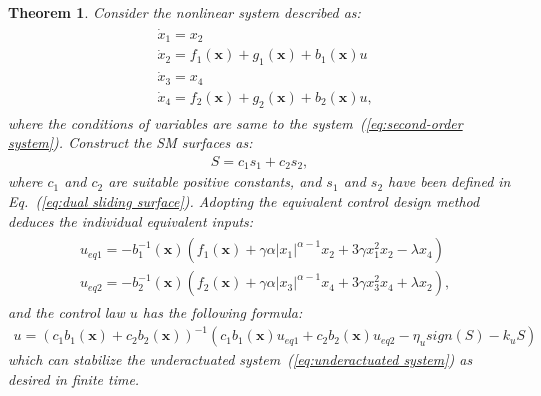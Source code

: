 \documentclass[3p]{elsarticle}
\theoremstyle{plain}
\newtheorem{mythm}{Theorem}
\theoremstyle{remark}
\begin{document}
\begin{mythm}
Consider the nonlinear system described as:
\begin{align}
\begin{split}
&\dot x_1 = x_2\\
&\dot x_2 = f_1(\bm x) + g_1(\bm x)+b_1(\bm x)u\\
&\dot x_3 = x_4\\
&\dot x_4 = f_2(\bm x) + g_2(\bm x)+b_2(\bm x)u,\label{eq:underactuated system}
\end{split}
\end{align}
where the conditions of variables are same to the system~(\ref{eq:second-order system}). Construct the SM surfaces as:
\begin{align}
S = c_1s_1+c_2s_2,
\end{align}
where $c_1$ and $c_2$ are suitable positive constants, and $s_1$ and $s_2$ have been defined in Eq.~(\ref{eq:dual sliding surface}). Adopting the equivalent control design method deduces the individual equivalent inputs:
\begin{align}
\begin{split}
&u_{eq1} = -b_1^{-1}(\bm x)(f_1(\bm x)+\gamma\alpha\vert x_1\vert^{\alpha-1}x_2+3\gamma x_1^2x_2-\lambda x_4)\\
&u_{eq2} = -b_2^{-1}(\bm x)(f_2(\bm x)+\gamma\alpha\vert x_3\vert^{\alpha-1}x_4+3\gamma x_3^2x_4+\lambda x_2),
\end{split}
\end{align}
and the control law $u$ has the following formula:
\begin{align}
u = (c_1b_1(\bm x)+c_2b_2(\bm x))^{-1}(c_1b_1(\bm x)u_{eq1}+c_2b_2(\bm x)u_{eq2}-\eta_u sign(S)-k_u S)\label{eq:underactuated input}
\end{align}
which can stabilize the underactuated system~(\ref{eq:underactuated system}) as desired in finite time.
\end{mythm}
\end{document}
